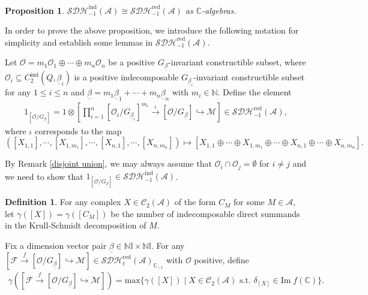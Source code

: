 \documentclass[12pt]{amsart}
\newtheorem{proposition}[theorem]{Proposition}
\theoremstyle{definition}
\newtheorem{definition}[theorem]{Definition}
\numberwithin{equation}{section}
\begin{document}
\begin{proposition}
    \label{ind=red(SDH)}
    $ \mathcal{SDH}_{-1}^{\mathrm{ind}}(\mathcal{A})  \cong \mathcal{SDH}_{-1}^{\mathrm{red}}(\mathcal{A}) $ as $ \mathbb{C} $-algebras. 
\end{proposition}

In order to prove the above proposition, we introduce the following notation for simplicity and establish some lemmas in $ \mathcal{SDH}_{-1}^{\mathrm{red}}(\mathcal{A}) $. 

Let $ \mathcal{O} = m_1 \mathcal{O}_1 \oplus \cdots \oplus m_n \mathcal{O}_n $ be a positive $ G_{\underline{\beta}} $-invariant constructible subset, where $ \mathcal{O}_i \subseteq C_2^{\mathrm{ind}}(Q, \underline{\beta}_i) $ is a positive indecomposable $ G_{\underline{\beta}_i} $-invariant constructible subset for any $ 1 \leqslant i \leqslant n $ and $ \underline{\beta} = m_1 \underline{\beta}_1 + \cdots + m_n \underline{\beta}_n $ with $ m_i \in \mathbb{N} $. 
Define the element
\begin{align*}
    1_{[\mathcal{O}/G_{\underline{\beta}}]} = 1 \otimes [\prod_{i=1}^n[\mathcal{O}_i/G_{\underline{\beta}_i}]^{m_i} \xrightarrow{\iota}[\mathcal{O}/G_{\underline{\beta}}]  \hookrightarrow \mathcal{M}] \in \mathcal{SDH}_{-1}^{\mathrm{red}}(\mathcal{A}),
\end{align*}
where $ \iota $ corresponds to the map
\[([X_{1,1}],\cdots,[X_{1,m_1}],\cdots,[X_{n,1}],\cdots,[X_{n,m_n}]) \mapsto [X_{1,1} \oplus \cdots \oplus X_{1,m_1} \oplus \cdots  \oplus X_{n,1}\oplus \cdots \oplus X_{n,m_n}].\]

By Remark \ref{disjoint union}, we may always assume that $ \mathcal{O}_i \cap \mathcal{O}_j = \emptyset $ for $ i \neq j $ and we need to show that $ 1_{[\mathcal{O}/G_{\underline{\beta}}]} \in \mathcal{SDH}_{-1}^{\mathrm{ind}}(\mathcal{A}) $.

\begin{definition}
    \label{Grading of gamma in C2A+}
    For any complex $ X \in \mathcal{C}_2(\mathcal{A}) $ of the form $ C_M $ for some $ M \in \mathcal{A} $, let $ \gamma([X])  =\gamma([C_M]) $ be the number of indecomposable direct summands in the Krull-Schmidt decomposition of $ M $. 
    
    Fix a dimension vector pair $ \underline{\beta} \in \mathbb{N}\mathbb{I} \times \mathbb{N}\mathbb{I} $. 
    For any $ [\mathcal{F} \xrightarrow{f} [\mathcal{O}/G_{\underline{\beta}}] \hookrightarrow \mathcal{M}] \in \mathcal{SDH}_t^{\mathrm{red}}(\mathcal{A})_{\mathbb{C}_{-1}}$ with $ \mathcal{O} $ positive, define
\begin{align*}
    \gamma([\mathcal{F} \xrightarrow{f} [\mathcal{O}/G_{\underline{\beta}}] \hookrightarrow \mathcal{M}]) = \mathrm{max} \{\gamma([X]) \mid  X \in \mathcal{C}_2(\mathcal{A}) \text{ s.t. }   \delta_{[X]}  \in \mathrm{Im}\;f(\mathbb{C}) \}.
\end{align*}

\end{definition}
\end{document}
